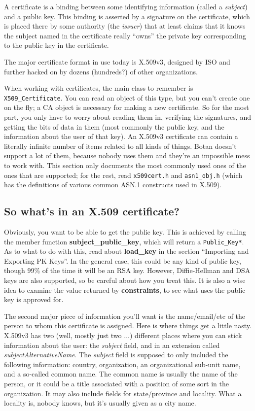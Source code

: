 \documentclass{article}
\newcommand{\filename}[1]{\texttt{#1}}
\newcommand{\function}[1]{\textbf{#1}}
\newcommand{\type}[1]{\texttt{#1}}
\begin{document}
A certificate is a binding between some identifying information
(called a \emph{subject}) and a public key. This binding is asserted
by a signature on the certificate, which is placed there by some
authority (the \emph{issuer}) that at least claims that it knows the
subject named in the certificate really ``owns'' the private key
corresponding to the public key in the certificate.

The major certificate format in use today is X.509v3, designed by ISO and
further hacked on by dozens (hundreds?) of other organizations.

When working with certificates, the main class to remember is
\type{X509\_Certificate}. You can read an object of this type, but you
can't create one on the fly; a CA object is necessary for making a new
certificate. So for the most part, you only have to worry about
reading them in, verifying the signatures, and getting the bits of
data in them (most commonly the public key, and the information about
the user of that key). An X.509v3 certificate can contain a literally
infinite number of items related to all kinds of things. Botan doesn't
support a lot of them, because nobody uses them and they're an
impossible mess to work with. This section only documents the most
commonly used ones of the ones that are supported; for the rest, read
\filename{x509cert.h} and \filename{asn1\_obj.h} (which has the
definitions of various common ASN.1 constructs used in X.509).

\subsection{So what's in an X.509 certificate?}

Obviously, you want to be able to get the public key. This is achieved
by calling the member function \function{subject\_public\_key}, which
will return a \type{Public\_Key*}. As to what to do with this, read
about \function{load\_key} in the section ``Importing and Exporting PK
Keys''. In the general case, this could be any kind of public key,
though 99\% of the time it will be an RSA key. However, Diffie-Hellman
and DSA keys are also supported, so be careful about how you treat
this. It is also a wise idea to examine the value returned by
\function{constraints}, to see what uses the public key is approved
for.

The second major piece of information you'll want is the
name/email/etc of the person to whom this certificate is
assigned. Here is where things get a little nasty. X.509v3 has two
(well, mostly just two $\ldots$) different places where you can stick
information about the user: the \emph{subject} field, and in an
extension called \emph{subjectAlternativeName}. The \emph{subject}
field is supposed to only included the following information: country,
organization, an organizational sub-unit name, and a so-called common
name. The common name is usually the name of the person, or it could
be a title associated with a position of some sort in the
organization. It may also include fields for state/province and
locality. What a locality is, nobody knows, but it's usually given as
a city name.
\end{document}
